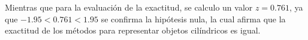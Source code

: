 Mientras que para la evaluación de la exactitud,  se calculo un valor $z=0.761$, ya que $-1.95<0.761<1.95$ se confirma la hipótesis nula, la cual afirma que la exactitud de los métodos para representar objetos cilíndricos es igual.

%
%
%
%
%



